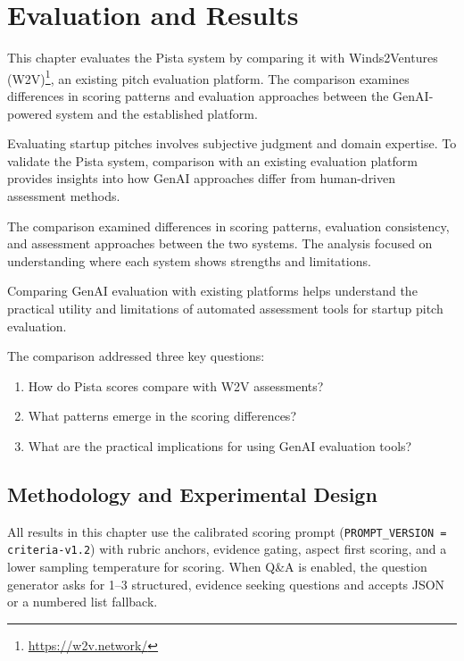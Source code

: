 \chapter{Evaluation and Results}
\label{ch:evaluation}

This chapter evaluates the Pista system by comparing it with Winds2Ventures (W2V)\footnote{\url{https://w2v.network/}}, an existing pitch evaluation platform. The comparison examines differences in scoring patterns and evaluation approaches between the GenAI-powered system and the established platform.

Evaluating startup pitches involves subjective judgment and domain expertise. To validate the Pista system, comparison with an existing evaluation platform provides insights into how GenAI approaches differ from human-driven assessment methods.

The comparison examined differences in scoring patterns, evaluation consistency, and assessment approaches between the two systems. The analysis focused on understanding where each system shows strengths and limitations.

Comparing GenAI evaluation with existing platforms helps understand the practical utility and limitations of automated assessment tools for startup pitch evaluation.

The comparison addressed three key questions:
\begin{enumerate}
    \item How do Pista scores compare with W2V assessments?
    \item What patterns emerge in the scoring differences?
    \item What are the practical implications for using GenAI evaluation tools?
\end{enumerate}

\section{Methodology and Experimental Design}
\label{sec:methodology}

All results in this chapter use the calibrated scoring prompt (\texttt{PROMPT\_VERSION = criteria\textrm{-}v1.2}) with rubric anchors, evidence gating, aspect first scoring, and a lower sampling temperature for scoring. When Q\&A is enabled, the question generator asks for 1--3 structured, evidence seeking questions and accepts JSON or a numbered list fallback.

